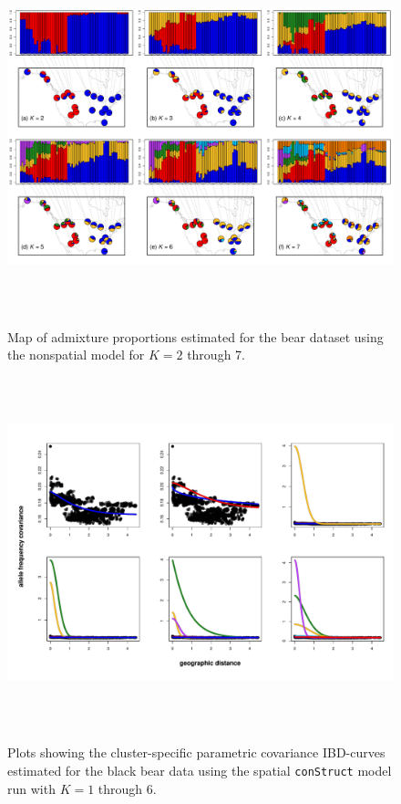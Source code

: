 \documentclass[12pt]{article}
\begin{document}
\begin{figure}
	\centering
		{\includegraphics[width=6in,height=4in]{figs/bears/bear_nsp_results.pdf}}
	\caption{
	Map of admixture proportions estimated for the bear dataset 
	using the nonspatial model for $K=2$ through 7.
    }\label{bear_nsp_pies}
\end{figure}

\begin{figure}
	\centering
		{\includegraphics[width=6in,height=4in]{figs/bears/bear_sp_clst_covs.pdf}}
	\caption{
	Plots showing the cluster-specific parametric covariance IBD-curves 
	estimated for the black bear data using 
	the spatial \texttt{conStruct} model run with $K=1$ through 6.
	 }\label{bear_sp_clst_covs}
\end{figure}
\end{document}
